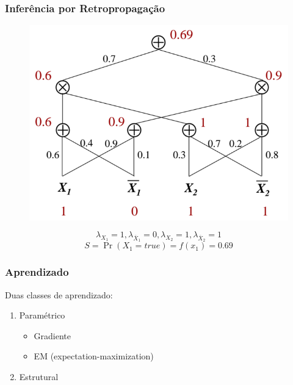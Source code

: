 \documentclass[10pt]{beamer}
\theoremstyle{plain}
\begin{document}
\begin{frame}
  \frametitle{Inferência por Retropropagação}

  \begin{figure}[h]
    \centering\includegraphics[scale=0.25]{imgs/marginals.png}
  \end{figure}
  \begin{equation*}
    \lambda_{X_1}=1,\lambda_{\overline{X}_1}=0,\lambda_{X_2}=1,\lambda_{\overline{X}_2}=1
  \end{equation*}
  \begin{equation*}
    S=\Pr(X_1=true)=f(x_1)=0.69
  \end{equation*}
\end{frame}

\begin{frame}
  \frametitle{Aprendizado}

  Duas classes de aprendizado:
  \begin{enumerate}
    \item Paramétrico~\cite{poon-domingos}
      \begin{itemize}
        \item Gradiente
        \item EM (expectation-maximization)
      \end{itemize}
    \item Estrutural~\cite{gens-domingos}
  \end{enumerate}
\end{frame}

\end{document}
